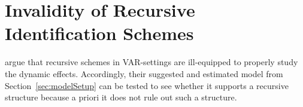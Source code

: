 \documentclass[a4paper,11pt,listof=nochaptergap,oneside,pointednumbers,bibtotoc,bigheadings,liststotoc,hidelinks]{scrbook}
\theoremstyle{mysatz}
\theoremstyle{mydefinition}
\theoremstyle{mytheorem}
\theoremstyle{mybemerkung}
\newcommand{\vect}[1]{\boldsymbol{\mathbf{#1}}}
\begin{document}
%

\section[Invalidity of Recursive Identification Schemes]{Invalidity of Recursive Identification Schemes}
\label{sec:ValidityRecursiveSchemes}
\citet{ludvigsonetal:19} argue that recursive schemes in VAR-settings are ill-equipped to properly study the dynamic effects. Accordingly, their suggested and estimated model from Section~\ref{sec:modelSetup} can be tested to see whether it supports a recursive structure because a priori it does not rule out such a structure. 
\end{document}
